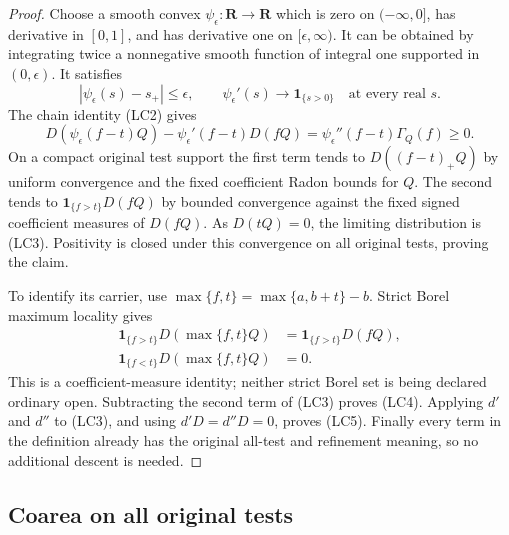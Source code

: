 \documentclass[11pt,a4paper]{article}
\numberwithin{equation}{section}
\theoremstyle{definition}
\theoremstyle{remark}
\begin{document}
\begin{proof}
Choose a smooth convex $\psi_\epsilon:\mathbf R\to\mathbf R$
which is zero on $(-\infty,0]$, has derivative in $[0,1]$, and
has derivative one on $[\epsilon,\infty)$.  It can be obtained by
integrating twice a nonnegative smooth function of integral one
supported in $(0,\epsilon)$.  It satisfies
\[
 |\psi_\epsilon(s)-s_+|\le\epsilon,
 \qquad
 \psi_\epsilon'(s)\longrightarrow\mathbf1_{\{s>0\}}
                   \quad\text{at every real }s.
\]
The chain identity (LC2) gives
\[
 D(\psi_\epsilon(f-t)Q)
        -\psi_\epsilon'(f-t)D(fQ)
            =\psi_\epsilon''(f-t)\Gamma_Q(f)\ge0.
 \tag{LC6}
\]
On a compact original test support the first term tends to
$D((f-t)_+Q)$ by uniform convergence and the fixed coefficient
Radon bounds for $Q$.  The second tends to
$\mathbf1_{\{f>t\}}D(fQ)$ by bounded convergence against the
fixed signed coefficient measures of $D(fQ)$.  As $D(tQ)=0$,
the limiting distribution is (LC3).  Positivity is closed under
this convergence on all original tests, proving the claim.

To identify its carrier, use $\max\{f,t\}=\max\{a,b+t\}-b$.
Strict Borel maximum locality gives
\[
 \begin{split}
 \mathbf1_{\{f>t\}}D(\max\{f,t\}Q)
        &=\mathbf1_{\{f>t\}}D(fQ),\\
 \mathbf1_{\{f<t\}}D(\max\{f,t\}Q)&=0.
 \end{split}
\]
This is a coefficient-measure identity; neither strict Borel set
is being declared ordinary open.  Subtracting the second term
of (LC3) proves (LC4).  Applying $d'$ and $d''$ to (LC3),
and using $d'D=d''D=0$, proves (LC5).  Finally every term in
the definition already has the original all-test and refinement
meaning, so no additional descent is needed.
\end{proof}

\subsection{Coarea on all original tests}
\end{document}
